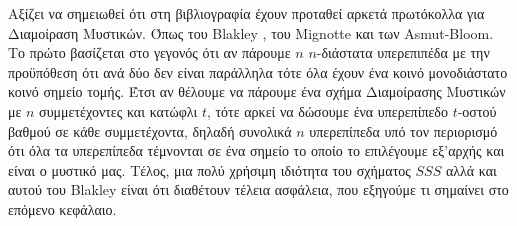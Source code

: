 Αξίζει να σημειωθεί ότι στη βιβλιογραφία έχουν προταθεί αρκετά πρωτόκολλα για Διαμοίραση Μυστικών. Όπως του Blakley \cite{blakley1979safeguarding}, του Mignotte και των Asmut-Bloom. Το πρώτο βασίζεται στο γεγονός ότι αν πάρουμε $n$ $n$-διάστατα υπερεπιπέδα με την προϋπόθεση ότι ανά δύο δεν είναι παράλληλα τότε όλα έχουν ένα κοινό μονοδιάστατο κοινό σημείο τομής. Έτσι αν θέλουμε να πάρουμε ένα σχήμα Διαμοίρασης Μυστικών με $n$ συμμετέχοντες και κατώφλι $t$, τότε αρκεί να δώσουμε ένα υπερεπίπεδο $t$-οστού βαθμού σε κάθε συμμετέχοντα, δηλαδή συνολικά $n$ υπερεπίπεδα υπό τον περιορισμό ότι όλα τα υπερεπίπεδα τέμνονται σε ένα σημείο το οποίο το επιλέγουμε εξ'αρχής και είναι ο μυστικό μας. Τέλος, μια πολύ χρήσιμη ιδιότητα του σχήματος $SSS$ αλλά και αυτού του Blakley είναι ότι διαθέτουν τέλεια ασφάλεια, που εξηγούμε τι σημαίνει στο επόμενο κεφάλαιο.